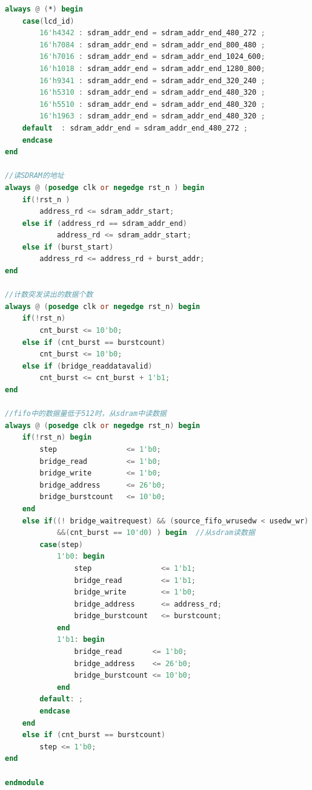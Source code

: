 \documentclass[12pt,hyperref,a4paper,UTF8]{ctexart}
\begin{document}
\begin{lstlisting}[language=Verilog]
always @ (*) begin
    case(lcd_id)
        16'h4342 : sdram_addr_end = sdram_addr_end_480_272 ;
        16'h7084 : sdram_addr_end = sdram_addr_end_800_480 ;
        16'h7016 : sdram_addr_end = sdram_addr_end_1024_600;
        16'h1018 : sdram_addr_end = sdram_addr_end_1280_800;
        16'h9341 : sdram_addr_end = sdram_addr_end_320_240 ;
        16'h5310 : sdram_addr_end = sdram_addr_end_480_320 ;
        16'h5510 : sdram_addr_end = sdram_addr_end_480_320 ;
        16'h1963 : sdram_addr_end = sdram_addr_end_480_320 ;
    default  : sdram_addr_end = sdram_addr_end_480_272 ;
    endcase 
end

//读SDRAM的地址
always @ (posedge clk or negedge rst_n ) begin
    if(!rst_n )
        address_rd <= sdram_addr_start;
    else if (address_rd == sdram_addr_end) 
            address_rd <= sdram_addr_start;
    else if (burst_start)
        address_rd <= address_rd + burst_addr; 
end

//计数突发读出的数据个数
always @ (posedge clk or negedge rst_n) begin
    if(!rst_n)
        cnt_burst <= 10'b0;
    else if (cnt_burst == burstcount) 
        cnt_burst <= 10'b0;
    else if (bridge_readdatavalid)
        cnt_burst <= cnt_burst + 1'b1;
end 

//fifo中的数据量低于512时，从sdram中读数据
always @ (posedge clk or negedge rst_n) begin
    if(!rst_n) begin
        step                <= 1'b0;   
        bridge_read         <= 1'b0;         
        bridge_write        <= 1'b0;
        bridge_address      <= 26'b0;
        bridge_burstcount   <= 10'b0;
    end 
    else if((! bridge_waitrequest) && (source_fifo_wrusedw < usedw_wr) 
            &&(cnt_burst == 10'd0) ) begin  //从sdram读数据
        case(step)    
            1'b0: begin 
                step                <= 1'b1;
                bridge_read         <= 1'b1;   
                bridge_write        <= 1'b0;
                bridge_address      <= address_rd;
                bridge_burstcount   <= burstcount;
            end 
            1'b1: begin
                bridge_read       <= 1'b0;   
                bridge_address    <= 26'b0;
                bridge_burstcount <= 10'b0;
            end
        default: ;         
        endcase   
    end 
    else if (cnt_burst == burstcount)  
        step <= 1'b0;
end

endmodule       


\end{lstlisting}
\end{document}
